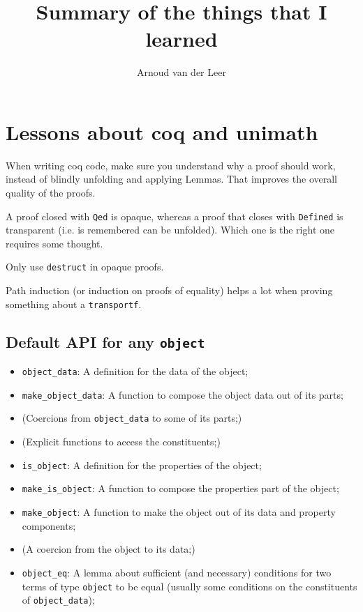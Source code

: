 \documentclass{amsbook}
\title{Summary of the things that I learned}
\author{Arnoud van der Leer}
\begin{document}
  \maketitle

  \chapter{Lessons about coq and unimath}
  When writing coq code, make sure you understand why a proof should work, instead of blindly unfolding and applying Lemmas. That improves the overall quality of the proofs.

  A proof closed with \texttt{Qed} is opaque, whereas a proof that closes with \texttt{Defined} is transparent (i.e. is remembered can be unfolded). Which one is the right one requires some thought.

  Only use \texttt{destruct} in opaque proofs.

  Path induction (or induction on proofs of equality) helps a lot when proving something about a \texttt{transportf}.

  \section{Default API for any \texttt{object}}
  \begin{itemize}
    \item \texttt{object\_data}: A definition for the data of the object;
    \item \texttt{make\_object\_data}: A function to compose the object data out of its parts;
    \item (Coercions from \texttt{object\_data} to some of its parts;)
    \item (Explicit functions to access the constituents;)
    \item \texttt{is\_object}: A definition for the properties of the object;
    \item \texttt{make\_is\_object}: A function to compose the properties part of the object;
    \item \texttt{make\_object}: A function to make the object out of its data and property components;
    \item (A coercion from the object to its data;)
    \item \texttt{object\_eq}: A lemma about sufficient (and necessary) conditions for two terms of type \texttt{object} to be equal (usually some conditions on the constituents of \texttt{object\_data});
  \end{itemize}
\end{document}
